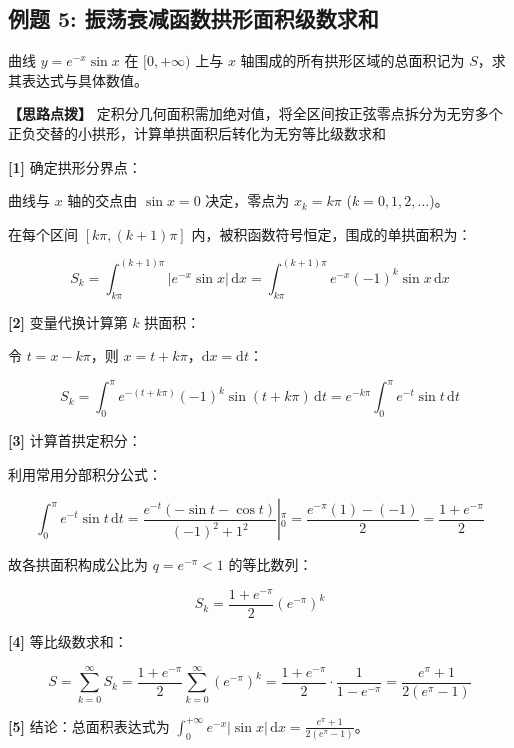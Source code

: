\documentclass[11pt,a4paper,UTF8]{ctexart}
\begin{document}
\subsection{例题 5: 振荡衰减函数拱形面积级数求和}

曲线 $y = e^{-x}\sin x$ 在 $[0, +\infty)$ 上与 $x$ 轴围成的所有拱形区域的总面积记为 $S$，求其表达式与具体数值。

\textbf{\color{DeepPurple}【思路点拨】} 定积分几何面积需加绝对值，将全区间按正弦零点拆分为无穷多个正负交替的小拱形，计算单拱面积后转化为无穷等比级数求和


\begin{solbox}[分步推导与答题规范]
\textbf{[1]} 确定拱形分界点：

曲线与 $x$ 轴的交点由 $\sin x = 0$ 决定，零点为 $x_k = k\pi$ ($k = 0, 1, 2, \dots$)。

在每个区间 $[k\pi, (k+1)\pi]$ 内，被积函数符号恒定，围成的单拱面积为：


\begin{equation*}
S_k = \int_{k\pi}^{(k+1)\pi} \vert{}e^{-x}\sin x\vert{}\,\mathrm{d}x = \int_{k\pi}^{(k+1)\pi} e^{-x} (-1)^k \sin x\,\mathrm{d}x
\end{equation*}


\textbf{[2]} 变量代换计算第 $k$ 拱面积：

令 $t = x - k\pi$，则 $x = t + k\pi$，$\mathrm{d}x = \mathrm{d}t$：


\begin{equation*}
S_k = \int_0^\pi e^{-(t+k\pi)} (-1)^k \sin(t+k\pi)\,\mathrm{d}t = e^{-k\pi} \int_0^\pi e^{-t}\sin t\,\mathrm{d}t
\end{equation*}


\textbf{[3]} 计算首拱定积分：

利用常用分部积分公式：


\begin{equation*}
\int_0^\pi e^{-t}\sin t\,\mathrm{d}t = \left. \frac{e^{-t}(-\sin t - \cos t)}{(-1)^2 + 1^2} \right\vert{}_0^\pi = \frac{e^{-\pi}(1) - (-1)}{2} = \frac{1 + e^{-\pi}}{2}
\end{equation*}


故各拱面积构成公比为 $q = e^{-\pi} < 1$ 的等比数列：


\begin{equation*}
S_k = \frac{1 + e^{-\pi}}{2} (e^{-\pi})^k
\end{equation*}


\textbf{[4]} 等比级数求和：


\begin{equation*}
S = \sum_{k=0}^\infty S_k = \frac{1 + e^{-\pi}}{2} \sum_{k=0}^\infty (e^{-\pi})^k = \frac{1 + e^{-\pi}}{2} \cdot \frac{1}{1 - e^{-\pi}} = \frac{e^\pi + 1}{2(e^\pi - 1)}
\end{equation*}


\textbf{[5]} 结论：总面积表达式为 $\int_0^{+\infty} e^{-x}\vert{}\sin x\vert{}\,\mathrm{d}x = \frac{e^\pi + 1}{2(e^\pi - 1)}$。
\end{solbox}
\end{document}
